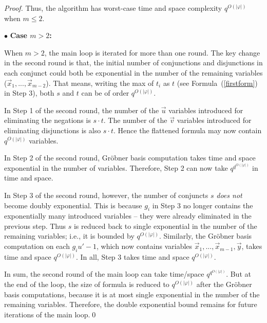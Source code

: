 \documentclass[envcountsect]{llncs}
\begin{document}
{{\begin{proof}
Thus, the algorithm has worst-case time and space complexity $q^{O(|\varphi|)}$ when $m\leq 2$.

$\bullet$ {\bf Case $m>2$:}

When $m> 2$, the main loop is iterated for more than one round. The key change in the second round is that, the initial number of conjunctions and disjunctions in each conjunct could both be exponential in the number of the remaining variables ($\vec x_1,...,\vec x_{m-2}$). That means, writing the max of $t_i$ as $t$ (see Formula~(\ref{firstform}) in Step 3), both $s$ and $t$ can be of order $q^{O(|\varphi|)}$. 

In Step 1 of the second round, the number of the $\vec u$ variables introduced for eliminating the negations is $s\cdot t$. The number of the $\vec v$ variables introduced for eliminating disjunctions is also $s\cdot t$. Hence the flattened formula may now contain $q^{O(|\varphi|)}$ variables. 

In Step 2 of the second round, Gr\"obner basis computation takes time and space exponential in the number of variables. Therefore, Step 2 can now take $q^{q^{O(|\varphi|)}}$ in time and space. 

In Step 3 of the second round, however, the number of conjuncts $s$ {\em does not} become doubly exponential. This is because $g_i$ in Step 3 no longer contains the exponentially many introduced variables -- they were already eliminated in the previous step. Thus $s$ is reduced back to single exponential in the number of the remaining variables; i.e., it is bounded by $q^{O(|\varphi|)}$. Similarly, the Gr\"obner basis computation on each $g_iu'-1$, which now contains variables $\vec x_1,...,\vec x_{m-1}, \vec y$,  takes time and space $q^{O(|\varphi|)}$. In all, Step 3 takes time and space $q^{O(|\varphi|)}$.

In sum, the second round of the main loop can take time/space $q^{q^{O(|\varphi|)}}$. But at the end of the loop, the size of formula is reduced to $q^{O(|\varphi|)}$ after the Gr\"obner basis computations, because it is at most single exponential in the number of the remaining variables. Therefore, the double exponential bound remains for future iterations of the main loop.\qed
\end{proof}

}}
\end{document}
